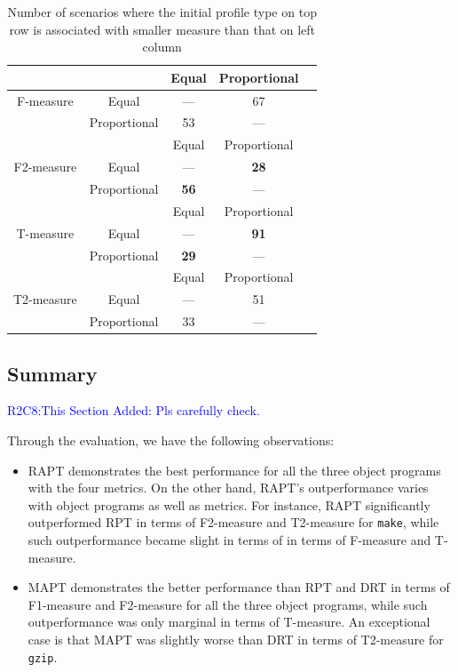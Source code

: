 \documentclass[10pt,journal,compsoc]{IEEEtran}
\begin{document}
\begin{table}
\caption{Number of scenarios where the initial profile type on top row is associated with smaller measure than that on left column}
\label{tab:PstaF}
\centering
\begin{tabular}{|c|c|c|c|c|} \hline
            &						& Equal				& Proportional	\\ \hline
F-measure   & Equal					& ---				& 67			\\ \hline
            & Proportional	        & 53				& ---			\\ \hline \hline

            &						& Equal			& Proportional	\\ \hline
F2-measure  & Equal					& ---			& \textbf{28}	\\ \hline
            & Proportional	       & \textbf{56}	& ---			\\ \hline \hline

            &						& Equal			& Proportional	\\ \hline
T-measure   & Equal					& ---			& \textbf{91}	\\ \hline
            &Proportional	       & \textbf{29}	& ---			\\ \hline \hline

            &						& Equal				& Proportional	\\ \hline
T2-measure  &Equal					& ---				& 51			\\ \hline
            &Proportional	       & 33					& ---			\\ \hline
\end{tabular}
\end{table}



\subsection{Summary }
\textcolor{blue}{R2C8:This Section Added: Pls carefully check.}

Through the evaluation, we have the following observations:
\begin{itemize}
\item RAPT demonstrates the best performance for all the three object programs with the four metrics. On the other hand, RAPT's outperformance varies with object programs as well as metrics. For instance, RAPT significantly outperformed RPT in terms of F2-measure and T2-measure for \texttt{make}, while such outperformance became slight in terms of in terms of F-measure and T-measure.
\item MAPT demonstrates the better performance than RPT and DRT in terms of F1-measure and F2-measure for all the three object programs, while such outperformance was only marginal in terms of T-measure. An exceptional case is that MAPT was slightly worse than DRT in terms of T2-measure for \texttt{gzip}.
\end{itemize}
\end{document}
